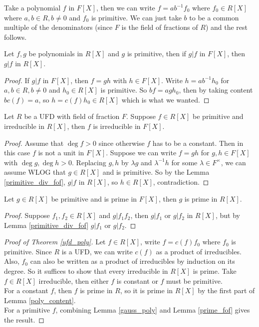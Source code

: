 \begin{remark}
    Take a polynomial $f$ in $F[X]$, then we can write $f=ab^{-1}f_0$ where $f_0\in R[X]$ where $a,b\in R,b\neq 0$ and $f_0$ is primitive.
    We can just take $b$ to be a common multiple of the denominators (since $F$ is the field of fractions of $R$) and the rest follows.
\end{remark}
\begin{lemma}\label{primitive_div_fof}
    Let $f,g$ be polynomials in $R[X]$ and $g$ is primitive, then if $g|f$ in $F[X]$, then $g|f$ in $R[X]$.
\end{lemma}
\begin{proof}
    If $g|f$ in $F[X]$, then $f=gh$ with $h\in F[X]$.
    Write $h=ab^{-1}h_0$ for $a,b\in R,b\neq 0$ and $h_0\in R[X]$ is primitive.
    So $bf=agh_0$, then by taking content $bc(f)=a$, so $h=c(f)h_0\in R[X]$ which is what we wanted.
\end{proof}
\begin{lemma}\label{gauss_poly}
    Let $R$ be a UFD with field of fraction $F$.
    Suppose $f\in R[X]$ be primitive and irreducible in $R[X]$, then $f$ is irreducible in $F[X]$.
\end{lemma}
\begin{proof}
    Assume that $\deg f>0$ since otherwise $f$ has to be a constant.
    Then in this case $f$ is not a unit in $F[X]$.
    Suppose we can write $f=gh$ for $g,h\in F[X]$ with $\deg g,\deg h>0$.
    Replacing $g,h$ by $\lambda g$ and $\lambda^{-1}h$ for some $\lambda\in F^\times$, we can assume WLOG that $g\in R[X]$ and is primitive.
    So by the Lemma \ref{primitive_div_fof}, $g|f$ in $R[X]$, so $h\in R[X]$, contradiction.
\end{proof}
\begin{lemma}\label{prime_fof}
    Let $g\in R[X]$ be primitive and is prime in $F[X]$, then $g$ is prime in $R[X]$.
\end{lemma}
\begin{proof}
    Suppose $f_1,f_2\in R[X]$ and $g|f_1f_2$, then $g|f_1$ or $g|f_2$ in $R[X]$, but by Lemma \ref{primitive_div_fof} $g|f_1$ or $g|f_2$.
\end{proof}
\begin{proof}[Proof of Theorem \ref{ufd_poly}]
    Let $f\in R[X]$, write $f=c(f)f_0$ where $f_0$ is primitive.
    Since $R$ is a UFD, we can write $c(f)$ as a product of irreducibles.
    Also, $f_0$ can also be written as a product of irreducibles by induction on its degree.
    So it suffices to show that every irreducible in $R[X]$ is prime.
    Take $f\in R[X]$ irreducible, then either $f$ is constant or $f$ must be primitive.\\
    For a constant $f$, then $f$ is prime in $R$, so it is prime in $R[X]$ by the first part of Lemma \ref{poly_content}.\\
    For a primitive $f$, combining Lemma \ref{gauss_poly} and Lemma \ref{prime_fof} gives the result.
\end{proof}
